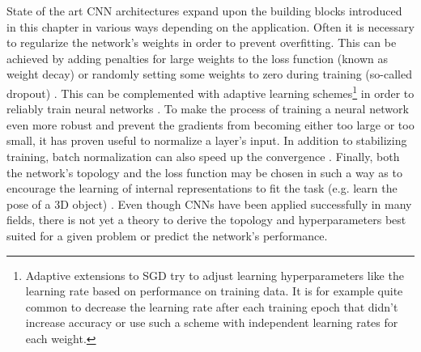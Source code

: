 State of the art CNN architectures expand upon the building blocks introduced in this chapter in various ways depending on the application. Often it is necessary to regularize the network's weights in order to prevent overfitting. This can be achieved by adding penalties for large weights to the loss function (known as weight decay) or randomly setting some weights to zero during training (so-called dropout) \cite{srivastava2014dropout,pmlr-v28-wan13,krogh1992simple,treadgold1998simulated}. This can be complemented with adaptive learning schemes\footnote{Adaptive extensions to SGD try to adjust learning hyperparameters like the learning rate based on performance on training data. It is for example quite common to decrease the learning rate after each training epoch that didn't increase accuracy or use such a scheme with independent learning rates for each weight.} in order to reliably train neural networks \cite{zeiler2012adadelta,duchi2011adaptive,kingma2014adam,polyak1992acceleration,graves2013generating,sutskever2013importance,loshchilov2016sgdr}. To make the process of training a neural network even more robust and prevent the gradients from becoming either too large or too small, it has proven useful to normalize a layer's input. In addition to stabilizing training, batch normalization can also speed up the convergence \cite{ba2016layer,ioffe2015batch,salimans2016weight}. Finally, both the network's topology and the loss function may be chosen in such a way as to encourage the learning of internal representations to fit the task (e.g. learn the pose of a 3D object) \cite{worrall2018cubenet,worrall2017harmonic,schmidt2012learning,cohen2016group}. Even though CNNs have been applied successfully in many fields, there is not yet a theory to derive the topology and hyperparameters best suited for a given problem or predict the network's performance.
